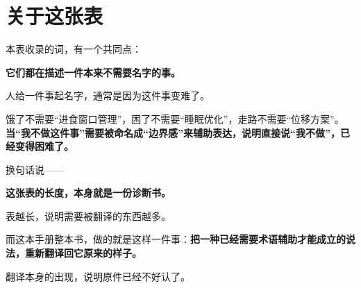 \section{关于这张表}

本表收录的词，有一个共同点：

\begin{mdquote}
\textbf{它们都在描述一件本来不需要名字的事。}
\end{mdquote}

人给一件事起名字，通常是因为这件事变难了。

饿了不需要“进食窗口管理”，困了不需要“睡眠优化”，走路不需要“位移方案”。\textbf{当“我不做这件事”需要被命名成“边界感”来辅助表达，说明直接说“我不做”，已经变得困难了。}

换句话说——

\begin{mdquote}
\textbf{这张表的长度，本身就是一份诊断书。}
\end{mdquote}

表越长，说明需要被翻译的东西越多。

而这本手册整本书，做的就是这样一件事：\textbf{把一种已经需要术语辅助才能成立的说法，重新翻译回它原来的样子。}

翻译本身的出现，说明原件已经不好认了。

